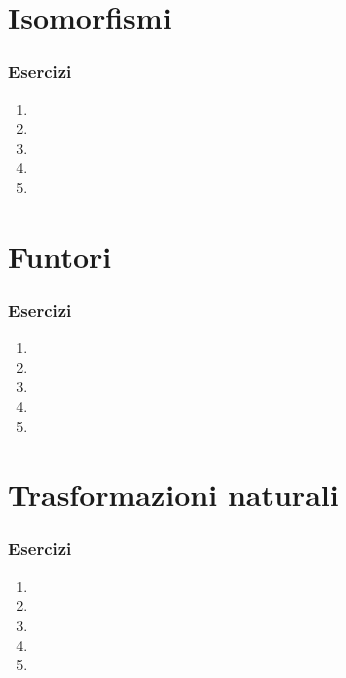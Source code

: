 \section{Isomorfismi}

\subsubsection*{Esercizi}
\begin{enumerate}
    \item 
    \item 
    \item 
    \item 
    \item 
\end{enumerate}


\section{Funtori}

\subsubsection*{Esercizi}
\begin{enumerate}
    \item 
    \item 
    \item 
    \item 
    \item 
\end{enumerate}


\section{Trasformazioni naturali}

\subsubsection*{Esercizi}
\begin{enumerate}
    \item 
    \item 
    \item 
    \item 
    \item 
\end{enumerate}
